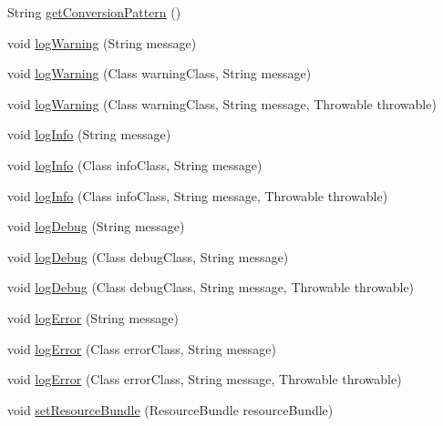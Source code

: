 \begin{DoxyCompactItemize}
\item 
String \mbox{\hyperlink{interfacenet_1_1dlinkddns_1_1atulsaurabh_1_1hasselfreelogger_1_1api_1_1_logger_af32cfe36f98ae7223ab0ec37fc6c67f5}{get\+Conversion\+Pattern}} ()
\item 
void \mbox{\hyperlink{interfacenet_1_1dlinkddns_1_1atulsaurabh_1_1hasselfreelogger_1_1api_1_1_logger_a7a267e7aa9c678bdb6a3a7ca02a10efd}{log\+Warning}} (String message)
\item 
void \mbox{\hyperlink{interfacenet_1_1dlinkddns_1_1atulsaurabh_1_1hasselfreelogger_1_1api_1_1_logger_a2db4a8f0188cecd4ba6780b31136ded8}{log\+Warning}} (Class warning\+Class, String message)
\item 
void \mbox{\hyperlink{interfacenet_1_1dlinkddns_1_1atulsaurabh_1_1hasselfreelogger_1_1api_1_1_logger_af0535a8b640adb65e6830468b327d1da}{log\+Warning}} (Class warning\+Class, String message, Throwable throwable)
\item 
void \mbox{\hyperlink{interfacenet_1_1dlinkddns_1_1atulsaurabh_1_1hasselfreelogger_1_1api_1_1_logger_a90d0ff9fde52620be6884f4dee4ba00f}{log\+Info}} (String message)
\item 
void \mbox{\hyperlink{interfacenet_1_1dlinkddns_1_1atulsaurabh_1_1hasselfreelogger_1_1api_1_1_logger_ac0c7463bc249c77cd33e02b99a77a8d8}{log\+Info}} (Class info\+Class, String message)
\item 
void \mbox{\hyperlink{interfacenet_1_1dlinkddns_1_1atulsaurabh_1_1hasselfreelogger_1_1api_1_1_logger_a07cf4314c71f95135245d10dffc14d2f}{log\+Info}} (Class info\+Class, String message, Throwable throwable)
\item 
void \mbox{\hyperlink{interfacenet_1_1dlinkddns_1_1atulsaurabh_1_1hasselfreelogger_1_1api_1_1_logger_aabcbfa63158adde4db9d5735ef47663c}{log\+Debug}} (String message)
\item 
void \mbox{\hyperlink{interfacenet_1_1dlinkddns_1_1atulsaurabh_1_1hasselfreelogger_1_1api_1_1_logger_a029beee59dc44362c279f0a067dd0703}{log\+Debug}} (Class debug\+Class, String message)
\item 
void \mbox{\hyperlink{interfacenet_1_1dlinkddns_1_1atulsaurabh_1_1hasselfreelogger_1_1api_1_1_logger_aff388bb623493721b9aac70ef39492ec}{log\+Debug}} (Class debug\+Class, String message, Throwable throwable)
\item 
void \mbox{\hyperlink{interfacenet_1_1dlinkddns_1_1atulsaurabh_1_1hasselfreelogger_1_1api_1_1_logger_ae6a2cef332dfb10951c4cbfd822bbb63}{log\+Error}} (String message)
\item 
void \mbox{\hyperlink{interfacenet_1_1dlinkddns_1_1atulsaurabh_1_1hasselfreelogger_1_1api_1_1_logger_adf72322be1f6a5eaf0cf1b491b430b06}{log\+Error}} (Class error\+Class, String message)
\item 
void \mbox{\hyperlink{interfacenet_1_1dlinkddns_1_1atulsaurabh_1_1hasselfreelogger_1_1api_1_1_logger_a387cbc7fc16609202f2c63e88233ba49}{log\+Error}} (Class error\+Class, String message, Throwable throwable)
\item 
void \mbox{\hyperlink{interfacenet_1_1dlinkddns_1_1atulsaurabh_1_1hasselfreelogger_1_1api_1_1_logger_ad230d0cc0820137da2e5842b3c850f10}{set\+Resource\+Bundle}} (Resource\+Bundle resource\+Bundle)
\end{DoxyCompactItemize}



